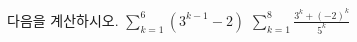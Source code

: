 다음을 계산하시오.
 $\displaystyle\sum_{k=1}^{6}(3^{k-1}-2)$
 $\displaystyle\sum_{k=1}^{8}\frac{3^k+(-2)^k}{5^k}$
